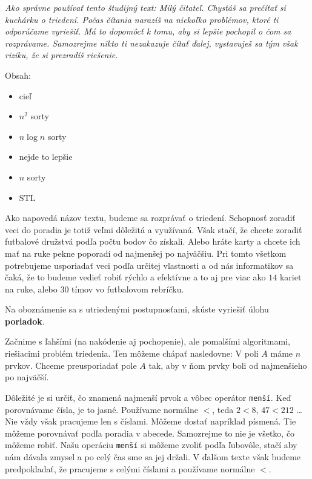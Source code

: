 




\textit{Ako správne používať tento študijný text: Milý čitateľ. Chystáš sa prečítať si kuchárku o
triedení. Počas čítania narazíš na niekoľko problémov, ktoré ti odporúčame vyriešiť. Má to dopomôcť
k tomu, aby si lepšie pochopil o čom sa rozprávame. Samozrejme nikto ti nezakazuje čítať ďalej,
vystavuješ sa tým však riziku, že si prezradíš riešenie.}

Obsah:
\begin{itemize}
    \item cieľ
    \item $n^2$ sorty
    \item $n\log n$ sorty
    \item nejde to lepšie
    \item $n$ sorty
    \item STL
\end{itemize}

\medskip

Ako napovedá názov textu, budeme sa rozprávať o triedení. Schopnosť zoradiť veci do poradia je totiž
veľmi dôležitá a využívaná. Však stačí, že chcete zoradiť futbalové družstvá podľa počtu bodov čo
získali. Alebo hráte karty a chcete ich mať na ruke pekne poporadí od najmenšej po najväčšiu. Pri
tomto všetkom potrebujeme usporiadať veci podľa určitej vlastnosti a od nás informatikov sa čaká, že
to budeme vedieť robiť rýchlo a efektívne a to aj pre viac ako $14$ kariet na ruke, alebo $30$ tímov
vo futbalovom rebríčku.

\medskip

Na oboznámenie sa s utriedenými postupnosťami, skúste vyriešiť úlohu \textbf{poriadok}.


Začnime s ľahšími (na nakódenie aj pochopenie), ale pomalšími algoritmami, riešiacimi problém
triedenia. Ten môžeme chápať nasledovne: V poli $A$ máme $n$ prvkov. Chceme preusporiadať pole $A$
tak, aby v ňom prvky boli od najmenšieho po najväčší.

Dôležité je si určiť, čo znamená najmenší prvok a vôbec operátor \texttt{menší}. Keď porovnávame
čísla, je to jasné. Používame normálne $<$, teda $2<8$, $47<212$ \dots Nie vždy však pracujeme len s
číslami. Môžeme dostať napríklad písmená. Tie môžeme porovnávať podľa poradia v abecede. Samozrejme
to nie je všetko, čo môžeme robiť. Našu operáciu \texttt{menší} si môžeme zvoliť podľa ľubovôle,
stačí aby nám dávala zmysel a po celý čas sme sa jej držali. V ďalšom texte však budeme
predpokladať, že pracujeme s celými číslami a používame normálne $<$.

